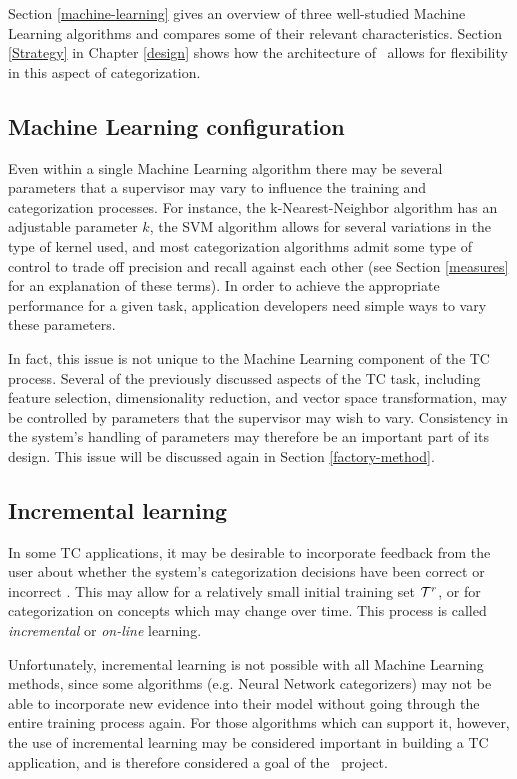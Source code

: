 Section \ref{machine-learning} gives an overview of three well-studied
Machine Learning algorithms and compares some of their relevant
characteristics.  Section \ref{Strategy} in Chapter \ref{design} shows
how the architecture of \aicat\ allows for flexibility in this aspect
of categorization.

\subsection{Machine Learning configuration}
\label{ml-config}

Even within a single Machine Learning algorithm there may be several
parameters that a supervisor may vary to influence the training and
categorization processes.  For instance, the k-Nearest-Neighbor
algorithm has an adjustable parameter $k$, the SVM algorithm allows
for several variations in the type of kernel used, and most
categorization algorithms admit some type of control to trade off
precision and recall against each other (see Section \ref{measures}
for an explanation of these terms).  In order to achieve the
appropriate performance for a given task, application developers need
simple ways to vary these parameters.

In fact, this issue is not unique to the Machine Learning component of
the TC process.  Several of the previously discussed aspects of the TC
task, including feature selection, dimensionality reduction, and
vector space transformation, may be controlled by parameters that the
supervisor may wish to vary.  Consistency in the system's handling of
parameters may therefore be an important part of its design.  This
issue will be discussed again in Section \ref{factory-method}.

\subsection{Incremental learning}

In some TC applications, it may be desirable to incorporate feedback
from the user about whether the system's categorization decisions have
been correct or incorrect \cite[p. 28]{sebastiani:02}. This may allow
for a relatively small initial training set $\mathcal{T}^r$, or for
categorization on concepts which may change over time.  This process
is called \emph{incremental} or \emph{on-line} learning.

Unfortunately, incremental learning is not possible with all Machine
Learning methods, since some algorithms (e.g. Neural Network
categorizers) may not be able to incorporate new evidence into their
model without going through the entire training process again.  For
those algorithms which can support it, however, the use of incremental
learning may be considered important in building a TC application, and
is therefore considered a goal of the \aicat\ project.


